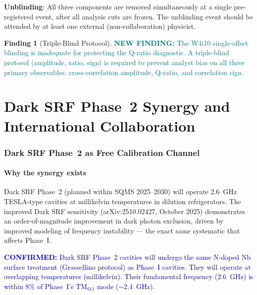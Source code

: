 \documentclass[11pt]{article}
\newcommand{\confirmed}[1]{\textcolor{blue}{\textbf{CONFIRMED:} #1}}
\newcommand{\newfinding}[1]{\textcolor{teal}{\textbf{NEW FINDING:} #1}}
\theoremstyle{definition}
\newtheorem{finding}[theorem]{Finding}
\theoremstyle{remark}
\begin{document}
\textbf{Unblinding}: All three components are removed simultaneously
at a single pre-registered event, after all analysis cuts are frozen.
The unblinding event should be attended by at least one external
(non-collaboration) physicist.

\begin{finding}[Triple-Blind Protocol]
\label{find:triple_blind}
\newfinding{The W4i10 single-offset blinding is inadequate for
protecting the Q-ratio diagnostic. A triple-blind protocol
(amplitude, ratio, sign) is required to prevent analyst bias on
all three primary observables: cross-correlation amplitude,
Q-ratio, and correlation sign.}
\end{finding}


\part{Dark SRF Phase~2 Synergy and International Collaboration}
\label{part:synergy}


\section{Dark SRF Phase~2 as Free Calibration Channel}
\label{sec:darksrf_synergy}

\subsection{Why the synergy exists}

Dark SRF Phase~2 (planned within SQMS 2025--2030) will operate
2.6~GHz TESLA-type cavities at millikelvin temperatures in dilution
refrigerators. The improved Dark SRF sensitivity (arXiv:2510.02427,
October 2025) demonstrates an order-of-magnitude improvement in
dark photon exclusion, driven by improved modeling of frequency
instability --- the exact same systematic that affects Phase~I.

\confirmed{Dark SRF Phase~2 cavities will undergo the same
N-doped Nb surface treatment (Grassellino protocol) as Phase~I
cavities. They will operate at overlapping temperatures (millikelvin).
Their fundamental frequency (2.6~GHz) is within 8\% of Phase~I's
TM$_{011}$ mode ($\sim$2.4~GHz).}
\end{document}
